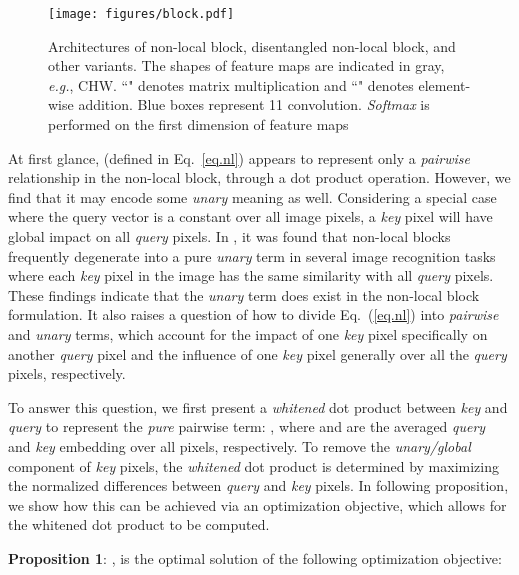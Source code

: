 \documentclass[runningheads]{llncs}
\begin{document}
\begin{figure*}[t]
\centering
\texttt{[image: figures/block.pdf]}
\vspace{-15pt}
\caption{Architectures of non-local block, disentangled non-local block, and other variants. The shapes of feature maps are indicated in gray, \textit{e.g.}, {CHW}. ``" denotes matrix multiplication and ``" denotes element-wise addition. Blue boxes represent 11 convolution. \textit{Softmax} is performed on the first dimension of feature maps}
\label{fig:dnl_block}
\vspace{-10pt}
\end{figure*}

At first glance,  (defined in Eq.~\ref{eq.nl}) appears to represent only a \emph{pairwise} relationship in the non-local block, through a dot product operation. However, we find that it may encode some \emph{unary} meaning as well. Considering a special case where the query vector is a constant over all image pixels, a \emph{key} pixel will have global impact on all \emph{query} pixels. In \cite{cao2019gcnet}, it was found that non-local blocks frequently degenerate into a pure \emph{unary} term in several image recognition tasks where each \emph{key} pixel in the image has the same similarity with all \emph{query} pixels. These findings indicate that the \emph{unary} term does exist in the non-local block formulation. It also raises a question of how to divide Eq.~(\ref{eq.nl}) into \emph{pairwise} and \emph{unary} terms, which account for the impact of one \emph{key} pixel specifically on another \emph{query} pixel and the influence of one \emph{key} pixel generally over all the \emph{query} pixels, respectively.

To answer this question, we first present a \emph{whitened} dot product between \emph{key} and \emph{query} to represent the \emph{pure} pairwise term: ,
where  and  are the averaged \emph{query} and \emph{key} embedding over all pixels, respectively.
To remove the \emph{unary/global} component of \emph{key} pixels, the \emph{whitened} dot product is determined by maximizing the normalized differences between \emph{query} and \emph{key} pixels. In following proposition, we show how this can be achieved via an optimization objective, which allows for the whitened dot product to be computed.

\noindent \textbf{Proposition 1}: ,  is the optimal solution of the following optimization objective:
\begin{footnotesize}

\end{footnotesize}
\end{document}
